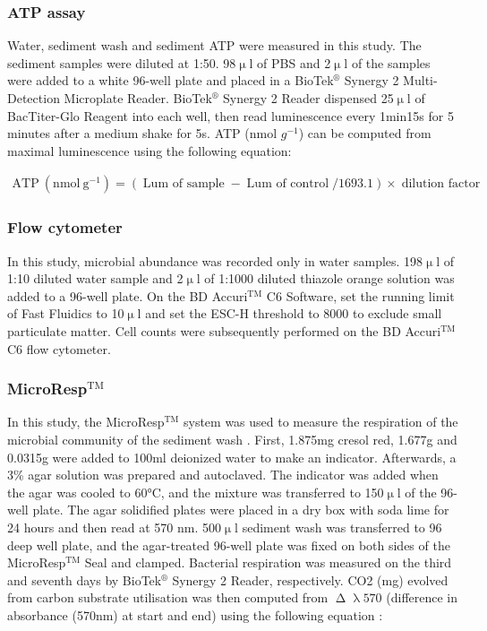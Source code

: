 \documentclass[11pt, a4paper]{article}
\begin{document}
\begin{spacing}{1.5}
\subsubsection{ATP assay}\label{section:M_ATP}

Water, sediment wash and sediment ATP were measured in this study. The sediment samples were diluted at 1:50. 98$\upmu$l of PBS and 2$\upmu$l of the samples were added to a white 96-well plate and placed in a BioTek$^\circledR$ Synergy 2 Multi-Detection Microplate Reader. BioTek$^\circledR$ Synergy 2 Reader dispensed 25$\upmu$l of BacTiter-Glo Reagent into each well, then read luminescence every 1min15s for 5 minutes after a medium shake for 5s. ATP (nmol $g^{-1}$) can be computed from maximal luminescence using the following equation:

\begin{align}\label{eq:ATP}
    \operatorname{ATP\ (nmol\ g^{-1})} = {\left(\operatorname{Lum\ of\ sample} - \operatorname{Lum\ of\  control} / 1693.1 \right)\times \operatorname{dilution\ factor}}
\end{align}

\subsubsection{Flow cytometer}\label{section:M_Flow}

In this study, microbial abundance was recorded only in water samples. 198$\upmu$l of 1:10 diluted water sample and 2$\upmu$l of 1:1000 diluted thiazole orange solution was added to a 96-well plate. On the BD Accuri$^\text{TM}$ C6 Software, set the running limit of Fast Fluidics to 10$\upmu$l and set the ESC-H threshold to 8000 to exclude small particulate matter. Cell counts were subsequently performed on the BD Accuri$^\text{TM}$ C6 flow cytometer.

\subsubsection{MicroResp$^\text{TM}$}\label{section:M_MR}

In this study, the MicroResp$^\text{TM}$ system was used to measure the respiration of the microbial community of the sediment wash \citep{campbell2003rapid}. First, 1.875mg cresol red, 1.677g  and 0.0315g  were added to 100ml deionized water to make an indicator. Afterwards, a 3\% agar solution was prepared and autoclaved. The indicator was added when the agar was cooled to 60°C, and the mixture was transferred to 150$\upmu$l of the 96-well plate. The agar solidified plates were placed in a dry box with soda lime for 24 hours and then read at 570 nm. 500$\upmu$l sediment wash was transferred to 96 deep well plate, and the agar-treated 96-well plate was fixed on both sides of the MicroResp$^\text{TM}$ Seal and clamped. Bacterial respiration was measured on the third and seventh days by BioTek$^\circledR$ Synergy 2 Reader, respectively. CO2 (mg) evolved from carbon substrate utilisation was then computed from $\upDelta \uplambda 570$ (difference in absorbance (570nm) at start and end) using the following equation \citep{rivett2016resource}:


\end{spacing}
\end{document}
